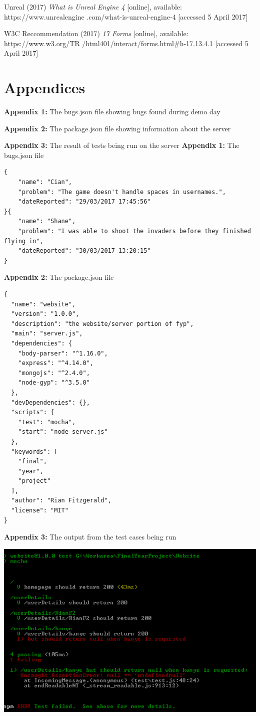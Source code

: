 \documentclass[12pt]{article}
\begin{document}
Unreal (2017) \textit{What is Unreal Engine 4} [online], available: https://www.unrealengine
\hangindent=0.5in .com/what-is-unreal-engine-4 [accessed 5 April 2017]

W3C Reccommendation (2017) \textit{17 Forms} [online], available: https://www.w3.org/TR
\hangindent=0.5in/html401/interact/forms.html{\#}h-17.13.4.1 [accessed 5 April 2017]

\newpage
\section*{Appendices}
\textbf{Appendix 1:} The bugs.json file showing bugs found during demo day

\textbf{Appendix 2:} The package.json file showing information about the server

\textbf{Appendix 3:} The result of tests being run on the server
\newpage
\textbf{Appendix 1:} The bugs.json file
\begin{lstlisting}
{
	"name": "Cian",
	"problem": "The game doesn't handle spaces in usernames.",
	"dateReported": "29/03/2017 17:45:56"
}{
	"name": "Shane",
	"problem": "I was able to shoot the invaders before they finished flying in",
	"dateReported": "30/03/2017 13:20:15"
}
\end{lstlisting}
\textbf{Appendix 2:} The package.json file
\begin{lstlisting}
{
  "name": "website",
  "version": "1.0.0",
  "description": "the website/server portion of fyp",
  "main": "server.js",
  "dependencies": {
    "body-parser": "^1.16.0",
    "express": "^4.14.0",
    "mongojs": "^2.4.0",
    "node-gyp": "^3.5.0"
  },
  "devDependencies": {},
  "scripts": {
    "test": "mocha",
    "start": "node server.js"
  },
  "keywords": [
    "final",
    "year",
    "project"
  ],
  "author": "Rian Fitzgerald",
  "license": "MIT"
}
\end{lstlisting}

\newpage
\textbf{Appendix 3:} The output from the test cases being run

\includegraphics[scale=1]{test.png}
\end{document}
